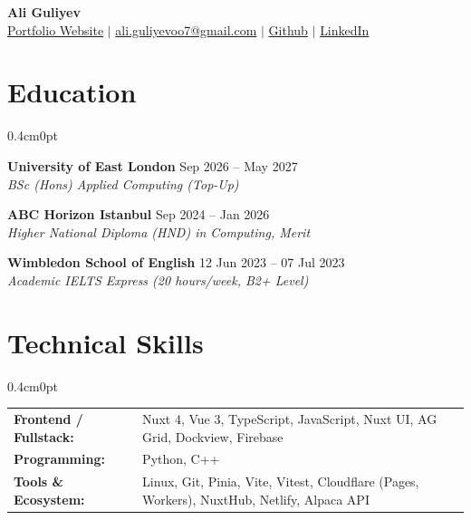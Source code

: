 \documentclass[a4paper,10pt]{article}
\newcommand{\Subtitle}[2][true]{%
    \vspace{0.3em}%
    {\fontsize{10.5}{12}\selectfont \textbf{#2}}%
    \ifstrequal{#1}{true}{\vspace{0.3em}}{}%
}
\begin{document}
\begin{center}
    {\fontsize{22}{24}\selectfont \textbf{Ali Guliyev}} \\[3pt]
    \href{https://aligu.me/}{Portfolio Website} $|$
    \href{mailto:ali.guliyevoo7@gmail.com}{ali.guliyevoo7@gmail.com} $|$
    \href{https://github.com/aligu7}{Github} $|$
    \href{https://www.linkedin.com/in/ali-guliyev-bb7211219/}{LinkedIn}
\end{center}

\vspace{-1.3em}
\section*{Education}
\begin{adjustwidth}{0.4cm}{0pt}

\Subtitle[false]{University of East London} \hfill Sep 2026 -- May 2027 \\
\textit{BSc (Hons) Applied Computing (Top-Up)}

\Subtitle[false]{ABC Horizon Istanbul} \hfill Sep 2024 -- Jan 2026 \\
\textit{Higher National Diploma (HND) in Computing, Merit}

\Subtitle[false]{Wimbledon School of English} \hfill 12 Jun 2023 -- 07 Jul 2023 \\
\textit{Academic IELTS Express (20 hours/week, B2+ Level)}

\end{adjustwidth}

\section*{Technical Skills}
\begin{adjustwidth}{0.4cm}{0pt}
\setlength{\tabcolsep}{1pt} %
\begin{tabular}{l l}
\textbf{Frontend / Fullstack:} & Nuxt 4, Vue 3, TypeScript, JavaScript, Nuxt UI, AG Grid, Dockview, Firebase \\
\textbf{Programming:} & Python, C++ \\
\textbf{Tools \& Ecosystem:} & Linux, Git, Pinia, Vite, Vitest, Cloudflare (Pages, Workers), NuxtHub, Netlify, Alpaca API \\
\end{tabular}
\end{adjustwidth}
\end{document}
